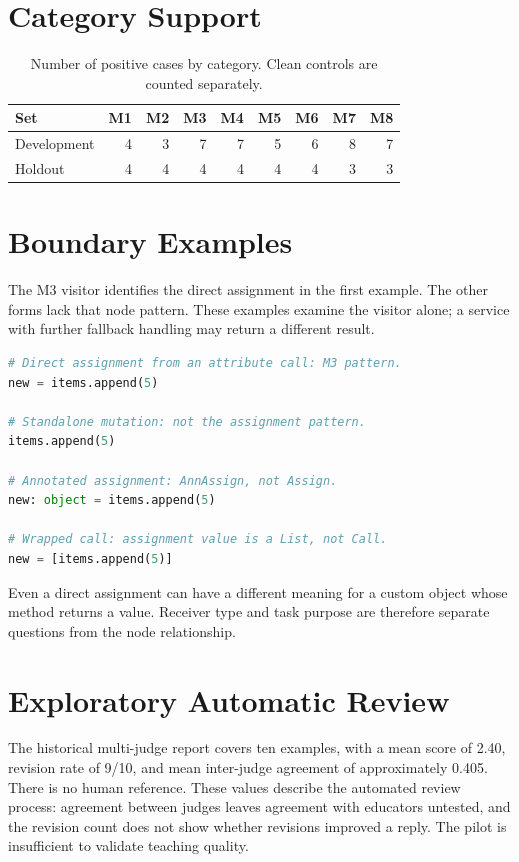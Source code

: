 \section{Category Support}
\begin{table}[htbp]
\centering
\caption{Number of positive cases by category. Clean controls are counted separately.}
\begin{tabular}{lrrrrrrrr}
\toprule
Set & M1 & M2 & M3 & M4 & M5 & M6 & M7 & M8\\
\midrule
Development & 4 & 3 & 7 & 7 & 5 & 6 & 8 & 7\\
Holdout & 4 & 4 & 4 & 4 & 4 & 4 & 3 & 3\\
\bottomrule
\end{tabular}
\end{table}

\section{Boundary Examples}
The M3 visitor identifies the direct assignment in the first example. The other forms lack that node pattern. These examples examine the visitor alone; a service with further fallback handling may return a different result.
\begin{lstlisting}[language=Python]
# Direct assignment from an attribute call: M3 pattern.
new = items.append(5)

# Standalone mutation: not the assignment pattern.
items.append(5)

# Annotated assignment: AnnAssign, not Assign.
new: object = items.append(5)

# Wrapped call: assignment value is a List, not Call.
new = [items.append(5)]
\end{lstlisting}
Even a direct assignment can have a different meaning for a custom object whose  method returns a value. Receiver type and task purpose are therefore separate questions from the node relationship.

\section{Exploratory Automatic Review}
The historical multi-judge report covers ten examples, with a mean score of 2.40, revision rate of 9/10, and mean inter-judge agreement of approximately 0.405. There is no human reference. These values describe the automated review process: agreement between judges leaves agreement with educators untested, and the revision count does not show whether revisions improved a reply. The pilot is insufficient to validate teaching quality.

